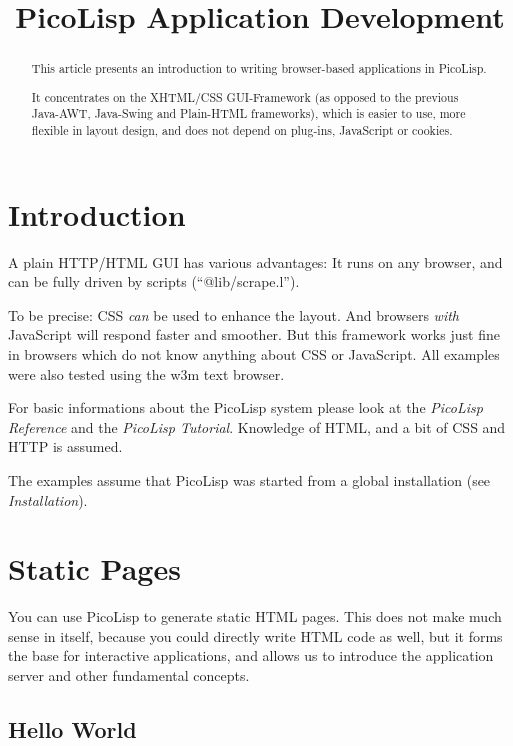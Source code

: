 \title{PicoLisp Application Development}

\maketitle


\begin{abstract}
  This article presents an introduction to writing browser-based
  applications in PicoLisp.

  It concentrates on the XHTML/CSS GUI-Framework (as opposed to the
  previous Java-AWT, Java-Swing and Plain-HTML frameworks), which is
  easier to use, more flexible in layout design, and does not depend
  on plug-ins, JavaScript or cookies.

\end{abstract}

\section{Introduction}
\label{sec:appl-devel-introduction}

A plain HTTP/HTML GUI has various advantages: It runs on any browser,
and can be fully driven by scripts (``@lib/scrape.l'').

To be precise: CSS \emph{can} be used to enhance the layout. And browsers
\emph{with} JavaScript will respond faster and smoother. But this framework
works just fine in browsers which do not know anything about CSS or
JavaScript. All examples were also tested using the w3m text browser.

For basic informations about the PicoLisp system please look at the
\emph{PicoLisp Reference} and the \emph{PicoLisp Tutorial}. Knowledge of HTML, and a bit of CSS and HTTP is assumed.

The examples assume that PicoLisp was started from a global installation
(see \emph{Installation}).

 
\section{Static Pages}
\label{sec:appl-devel-static-pages}


You can use PicoLisp to generate static HTML pages. This does not make
much sense in itself, because you could directly write HTML code as
well, but it forms the base for interactive applications, and allows us
to introduce the application server and other fundamental concepts.

 
\subsection{Hello World}
\label{sec:appl-devel-hello-world}



